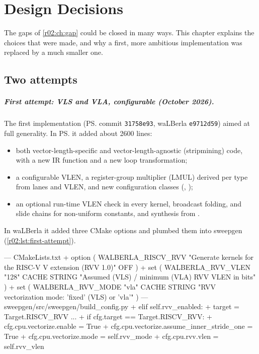 \chapter{Design Decisions}\label{r02:ch:design}

The gaps of \cref{r02:ch:gap} could be closed in many ways. This chapter explains the
choices that were made, and why a first, more ambitious implementation was replaced by
a much smaller one.

\section{Two attempts}\label{r02:sec:design-history}

\paragraph{First attempt: VLS and VLA, configurable (October 2026).}
The first implementation (\ps{} commit \texttt{31758e93}, waLBerla \texttt{e9712d59})
aimed at full generality. In \ps{} it added about 2600 lines:
\begin{itemize}
  \item both vector-length-specific and vector-length-agnostic (stripmining) code, with
        a new IR function  and a new  loop
        transformation;
  \item a configurable VLEN, a register-group multiplier (LMUL) derived per type from
        lanes and VLEN, and new configuration classes (,
        );
  \item an optional run-time VLEN check in every kernel, broadcast folding, 
        and slide chains for non-uniform constants, and  synthesis from
        .
\end{itemize}
In waLBerla it added three CMake options and plumbed them into sweepgen
(\cref{r02:lst:first-attempt}).

\begin{diffcode}[nolol=false,caption={[The first attempt in waLBerla]The first attempt in waLBerla (commit \texttt{e9712d59}, abridged): new options, mapped into sweepgen, which then forced vectorization.},label=r02:lst:first-attempt]
--- CMakeLists.txt
+ option ( WALBERLA_RISCV_RVV  "Generate kernels for the RISC-V V extension (RVV 1.0)" OFF )
+ set    ( WALBERLA_RVV_VLEN "128" CACHE STRING "Assumed (VLS) / minimum (VLA) RVV VLEN in bits" )
+ set    ( WALBERLA_RVV_MODE "vla" CACHE STRING "RVV vectorization mode: 'fixed' (VLS) or 'vla'" )
--- sweepgen/src/sweepgen/build_config.py
+        elif self.rvv_enabled:
+            target = Target.RISCV_RVV
 ...
+        if cfg.target == Target.RISCV_RVV:
+            cfg.cpu.vectorize.enable = True
+            cfg.cpu.vectorize.assume_inner_stride_one = True
+            cfg.cpu.vectorize.mode = self.rvv_mode
+            cfg.cpu.rvv.vlen = self.rvv_vlen
\end{diffcode}

